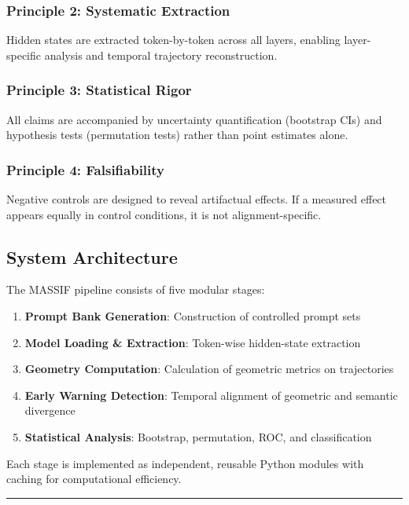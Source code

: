 \documentclass[12pt,a4paper]{article}
\begin{document}
\subsubsection*{Principle 2: Systematic Extraction}

Hidden states are extracted token-by-token across all layers, enabling layer-specific analysis and temporal trajectory reconstruction.

\subsubsection*{Principle 3: Statistical Rigor}

All claims are accompanied by uncertainty quantification (bootstrap CIs) and hypothesis tests (permutation tests) rather than point estimates alone.

\subsubsection*{Principle 4: Falsifiability}

Negative controls are designed to reveal artifactual effects. If a measured effect appears equally in control conditions, it is not alignment-specific.

\subsection{System Architecture}

The MASSIF pipeline consists of five modular stages:

\begin{enumerate}
    \item \textbf{Prompt Bank Generation}: Construction of controlled prompt sets
    \item \textbf{Model Loading \& Extraction}: Token-wise hidden-state extraction
    \item \textbf{Geometry Computation}: Calculation of geometric metrics on trajectories
    \item \textbf{Early Warning Detection}: Temporal alignment of geometric and semantic divergence
    \item \textbf{Statistical Analysis}: Bootstrap, permutation, ROC, and classification
\end{enumerate}

Each stage is implemented as independent, reusable Python modules with caching for computational efficiency.

\medskip
\hrule
\medskip
\end{document}
